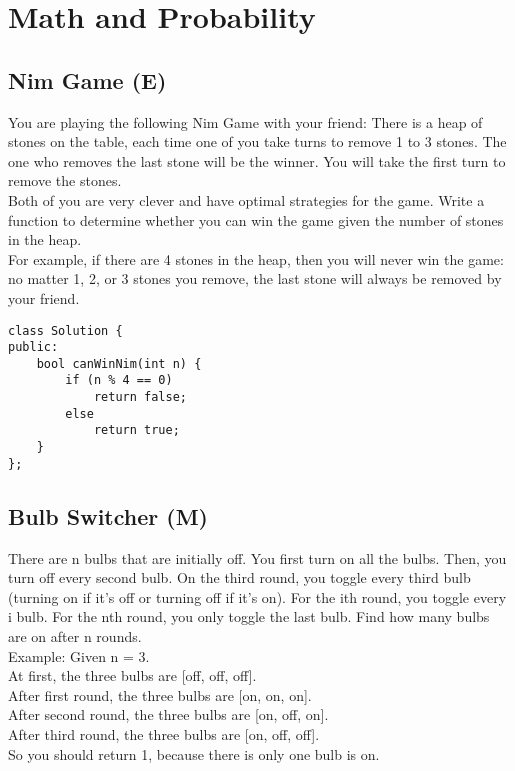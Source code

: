 \chapter{Math and Probability}


\section{Nim Game (E)}
You are playing the following Nim Game with your friend: There is a heap of stones on the table, each time one of you take turns to remove 1 to 3 stones. The one who removes the last stone will be the winner. You will take the first turn to remove the stones. \\

Both of you are very clever and have optimal strategies for the game. Write a function to determine whether you can win the game given the number of stones in the heap. \\

For example, if there are 4 stones in the heap, then you will never win the game: no matter 1, 2, or 3 stones you remove, the last stone will always be removed by your friend. \\

\begin{lstlisting}
class Solution {
public:
    bool canWinNim(int n) {
        if (n % 4 == 0)
            return false;
        else
            return true;
    }
};
\end{lstlisting}


\section{Bulb Switcher (M)}
There are n bulbs that are initially off. You first turn on all the bulbs. Then, you turn off every second bulb. On the third round, you toggle every third bulb (turning on if it's off or turning off if it's on). For the ith round, you toggle every i bulb. For the nth round, you only toggle the last bulb. Find how many bulbs are on after n rounds. \\

Example:
Given n = 3. \\
At first, the three bulbs are [off, off, off].\\
After first round, the three bulbs are [on, on, on].\\
After second round, the three bulbs are [on, off, on].\\
After third round, the three bulbs are [on, off, off]. \\
So you should return 1, because there is only one bulb is on.\\

